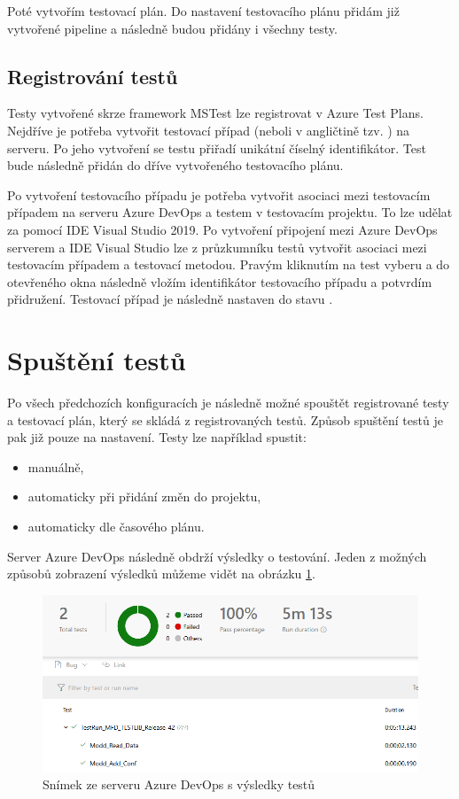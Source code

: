 Poté vytvořím testovací plán. Do nastavení testovacího plánu přidám již vytvořené pipeline a následně budou přidány i všechny testy. 

\subsection{Registrování testů}
Testy vytvořené skrze framework MSTest lze registrovat v Azure Test Plans. Nejdříve je potřeba vytvořit testovací případ (neboli v angličtině tzv. ) na serveru. Po jeho vytvoření se testu přiřadí unikátní číselný identifikátor. Test bude následně přidán do dříve vytvořeného testovacího plánu.

Po vytvoření testovacího případu je potřeba vytvořit asociaci mezi testovacím případem na serveru Azure DevOps a testem v testovacím projektu. To lze udělat za pomocí IDE Visual Studio 2019. Po vytvoření připojení mezi Azure DevOps serverem a IDE Visual Studio lze z průzkumníku testů vytvořit asociaci mezi testovacím případem a testovací metodou. Pravým kliknutím na test vyberu  a do otevřeného okna následně vložím identifikátor testovacího případu a potvrdím přidružení. Testovací případ je následně nastaven do stavu .

\section{Spuštění testů}
Po všech předchozích konfiguracích je následně možné spouštět registrované testy a testovací plán, který se skládá z registrovaných testů. Způsob spuštění testů je pak již pouze na nastavení. Testy lze například spustit:

\begin{itemize}
    \item manuálně,
    \item automaticky při přidání změn do projektu,
    \item automaticky dle časového plánu.
\end{itemize}

Server Azure DevOps následně obdrží výsledky o testování. Jeden z možných způsobů zobrazení výsledků můžeme vidět na obrázku \ref{fig:azure}. 

\begin{figure}[htbp]
    \centering 
    \includegraphics[width=\textwidth]{assets/img/azure.png}
    \caption{Snímek ze serveru Azure DevOps s výsledky testů}
    \label{fig:azure}
\end{figure}

